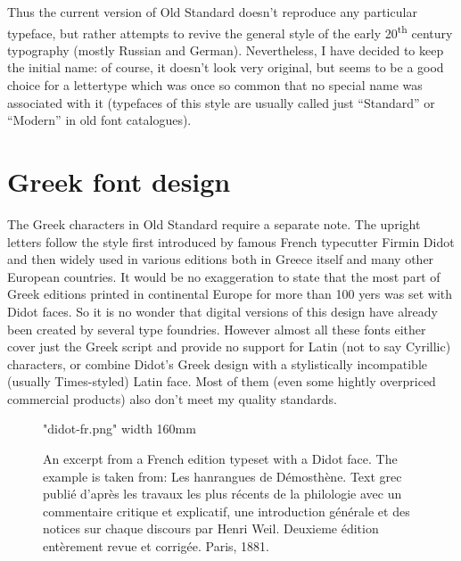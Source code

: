 \documentclass[12pt,a4paper,openany]{book}
\begin{document}
Thus the current version of Old Standard doesn’t reproduce any particular
typeface, but rather attempts to revive the general style of the early
20\textsuperscript{th} century typography (mostly Russian and German).
Nevertheless, I have decided to keep the initial name: of course, it
doesn’t look very original, but seems to be a good choice for a lettertype
which was once so common that no special name was associated with it
(typefaces of this style are usually called just “Standard” or “Modern” in
old font catalogues).

\section{Greek font design}

The Greek characters in Old Standard require a separate note. The upright
letters follow the style first introduced by famous French typecutter
Firmin Didot and then widely used in various editions both in Greece itself
and many other European countries. It would be no exaggeration to state that
the most part of Greek editions printed in continental Europe for more than
100 yers was set with Didot faces. So it is no wonder that digital versions
of this design have already been created by several type foundries. However
almost all these fonts either cover just the Greek script and provide no
support for Latin (not to say Cyrillic) characters, or combine Didot's Greek
design with a stylistically incompatible (usually Times-styled) Latin face.
Most of them (even some hightly overpriced commercial products) also 
don't meet my quality standards.

\begin{figure}[htb]

\centerline{\XeTeXpicfile "didot-fr.png" width 160mm}

\caption{An excerpt from a French edition typeset with a Didot face. The 
example is taken from: Les hanrangues de Démosthène. Text grec publié 
d’après les travaux les plus récents de la philologie avec un commentaire 
critique et explicatif, une introduction générale et des notices sur chaque 
discours par Henri Weil. Deuxieme édition entèrement revue et corrigée. 
Paris, 1881.}

\hypertarget{fig:didot-fr}{}\label{fig:didot-fr}

\end{figure}
\end{document}
